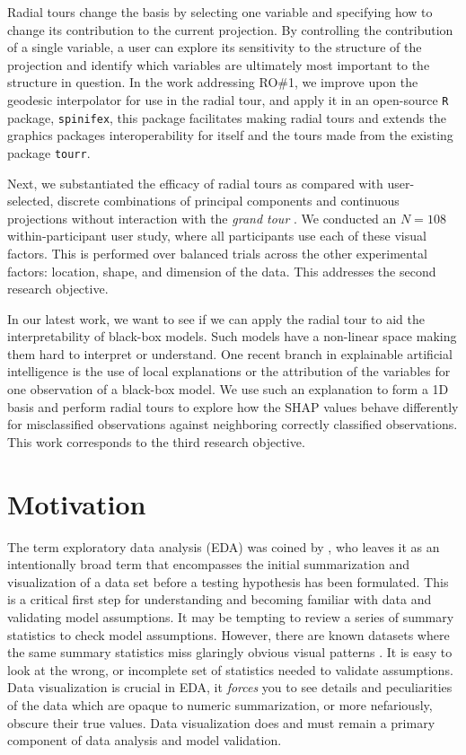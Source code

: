 \documentclass{template/monashthesis}
\begin{document}
Radial tours change the basis by selecting one variable and specifying how to change its contribution to the current projection. By controlling the contribution of a single variable, a user can explore its sensitivity to the structure of the projection and identify which variables are ultimately most important to the structure in question. In the work addressing RO\#1, we improve upon the geodesic interpolator for use in the radial tour, and apply it in an open-source \texttt{R} package, \texttt{spinifex}, this package facilitates making radial tours and extends the graphics packages interoperability for itself and the tours made from the existing package \texttt{tourr}.

Next, we substantiated the efficacy of radial tours as compared with user-selected, discrete combinations of principal components \autocite{pearson_liii._1901} and continuous projections without interaction with the \emph{grand tour} \autocite{asimov_grand_1985}. We conducted an \(N=108\) within-participant user study, where all participants use each of these visual factors. This is performed over balanced trials across the other experimental factors: location, shape, and dimension of the data. This addresses the second research objective.

In our latest work, we want to see if we can apply the radial tour to aid the interpretability of black-box models. Such models have a non-linear space making them hard to interpret or understand. One recent branch in explainable artificial intelligence \autocite[XAI,][\textcite{arrieta_explainable_2020}]{adadi_peeking_2018} is the use of local explanations or the attribution of the variables for one observation of a black-box model. We use such an explanation to form a 1D basis and perform radial tours to explore how the SHAP values behave differently for misclassified observations against neighboring correctly classified observations. This work corresponds to the third research objective.

\hypertarget{motivation}{%
\section{Motivation}\label{motivation}}

The term exploratory data analysis (EDA) was coined by \textcite{tukey_exploratory_1977}, who leaves it as an intentionally broad term that encompasses the initial summarization and visualization of a data set before a testing hypothesis has been formulated. This is a critical first step for understanding and becoming familiar with data and validating model assumptions. It may be tempting to review a series of summary statistics to check model assumptions. However, there are known datasets where the same summary statistics miss glaringly obvious visual patterns \autocite{anscombe_graphs_1973,matejka_same_2017}. It is easy to look at the wrong, or incomplete set of statistics needed to validate assumptions. Data visualization is crucial in EDA, it \emph{forces} you to see details and peculiarities of the data which are opaque to numeric summarization, or more nefariously, obscure their true values. Data visualization does and must remain a primary component of data analysis and model validation.
\end{document}
